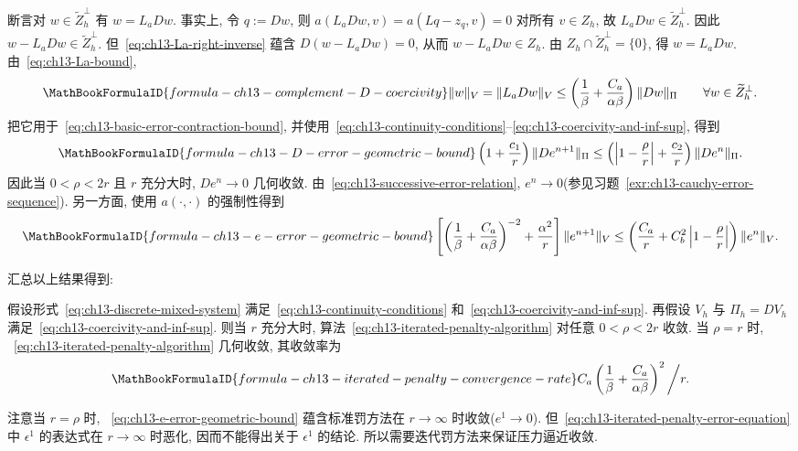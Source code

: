 断言对 $w\in\widetilde Z_h^\perp$ 有 $w=L_aDw$. 事实上, 令 $q:=Dw$, 则
$a(L_aDw,v)=a(Lq-z_q,v)=0$ 对所有 $v\in Z_h$, 故 $L_aDw\in\widetilde Z_h^\perp$. 因此 $w-L_aDw\in\widetilde Z_h^\perp$. 但~\eqref{eq:ch13-La-right-inverse} 蕴含 $D(w-L_aDw)=0$, 从而 $w-L_aDw\in Z_h$. 由 $Z_h\cap\widetilde Z_h^\perp=\{0\}$, 得 $w=L_aDw$. 由~\eqref{eq:ch13-La-bound},
\begin{equation}
\MathBookFormulaID{formula-ch13-complement-D-coercivity}
\label{eq:ch13-complement-D-coercivity}
\|w\|_V=\|L_aDw\|_V
\leq\left(\frac1\beta+\frac{C_a}{\alpha\beta}\right)\|Dw\|_\Pi
\qquad\forall w\in\widetilde Z_h^\perp.
\end{equation}
把它用于~\eqref{eq:ch13-basic-error-contraction-bound}, 并使用~\eqref{eq:ch13-continuity-conditions}--\eqref{eq:ch13-coercivity-and-inf-sup}, 得到
\begin{equation}
\MathBookFormulaID{formula-ch13-D-error-geometric-bound}
\label{eq:ch13-D-error-geometric-bound}
\left(1+\frac{c_1}{r}\right)\|De^{n+1}\|_\Pi
\leq\left(\left|1-\frac\rho r\right|+\frac{c_2}{r}\right)\|De^n\|_\Pi.
\end{equation}
因此当 $0<\rho<2r$ 且 $r$ 充分大时, $De^n\to0$ 几何收敛. 由~\eqref{eq:ch13-successive-error-relation}, $e^n\to0$(参见习题~\ref{exr:ch13-cauchy-error-sequence}). 另一方面, 使用 $a(\cdot,\cdot)$ 的强制性得到
\begin{equation}
\MathBookFormulaID{formula-ch13-e-error-geometric-bound}
\label{eq:ch13-e-error-geometric-bound}
\left[\left(\frac1\beta+\frac{C_a}{\alpha\beta}\right)^{-2}
+\frac{\alpha^2}{r}\right]\|e^{n+1}\|_V
\leq\left(\frac{C_a}{r}+C_b^2\left|1-\frac\rho r\right|\right)\|e^n\|_V.
\end{equation}

汇总以上结果得到:
\begin{Theorem}
\label{thm:ch13-iterated-penalty-convergence}
假设形式~\eqref{eq:ch13-discrete-mixed-system} 满足~\eqref{eq:ch13-continuity-conditions} 和~\eqref{eq:ch13-coercivity-and-inf-sup}. 再假设 $V_h$ 与 $\Pi_h=DV_h$ 满足~\eqref{eq:ch13-coercivity-and-inf-sup}. 则当 $r$ 充分大时, 算法~\eqref{eq:ch13-iterated-penalty-algorithm} 对任意 $0<\rho<2r$ 收敛. 当 $\rho=r$ 时, ~\eqref{eq:ch13-iterated-penalty-algorithm} 几何收敛, 其收敛率为
\[
\MathBookFormulaID{formula-ch13-iterated-penalty-convergence-rate}
C_a\left(\frac1\beta+\frac{C_a}{\alpha\beta}\right)^2\bigg/r.
\]
\end{Theorem}

注意当 $r=\rho$ 时, ~\eqref{eq:ch13-e-error-geometric-bound} 蕴含标准罚方法在 $r\to\infty$ 时收敛($e^1\to0$). 但~\eqref{eq:ch13-iterated-penalty-error-equation} 中 $\epsilon^1$ 的表达式在 $r\to\infty$ 时恶化, 因而不能得出关于 $\epsilon^1$ 的结论. 所以需要迭代罚方法来保证压力逼近收敛.
